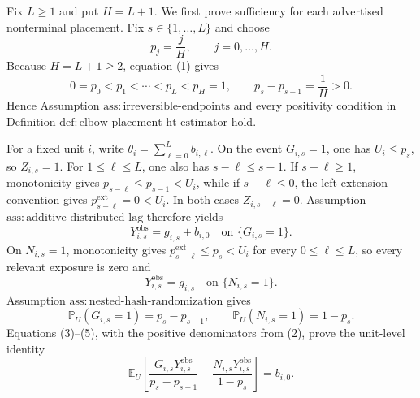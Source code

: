 Fix \(L\geq1\) and put \(H=L+1\).  We first prove sufficiency for each advertised nonterminal placement.  Fix \(s\in\{1,\ldots,L\}\) and choose
\[
 p_j=\frac{j}{H},\qquad j=0,\ldots,H.
\tag{1}
\]
Because \(H=L+1\geq2\), equation (1) gives
\[
 0=p_0<p_1<\cdots<p_L<p_H=1,
 \qquad
 p_s-p_{s-1}=\frac1H>0.
\tag{2}
\]
Hence Assumption \(\mathrm{ass:irreversible\text{-}endpoints}\) and every positivity condition in Definition \(\mathrm{def:elbow\text{-}placement\text{-}ht\text{-}estimator}\) hold.

For a fixed unit \(i\), write \(\theta_i=\sum_{\ell=0}^{L}b_{i,\ell}\).  On the event \(G_{i,s}=1\), one has \(U_i\leq p_s\), so \(Z_{i,s}=1\).  For \(1\leq\ell\leq L\), one also has \(s-\ell\leq s-1\).  If \(s-\ell\geq1\), monotonicity gives \(p_{s-\ell}\leq p_{s-1}<U_i\), while if \(s-\ell\leq0\), the left-extension convention gives \(p^{\mathrm{ext}}_{s-\ell}=0<U_i\).  In both cases \(Z_{i,s-\ell}=0\).  Assumption \(\mathrm{ass:additive\text{-}distributed\text{-}lag}\) therefore yields
\[
 Y^{\mathrm{obs}}_{i,s}=g_{i,s}+b_{i,0}
 \quad\text{on }\{G_{i,s}=1\}.
\tag{3}
\]
On \(N_{i,s}=1\), monotonicity gives \(p^{\mathrm{ext}}_{s-\ell}\leq p_s<U_i\) for every \(0\leq\ell\leq L\), so every relevant exposure is zero and
\[
 Y^{\mathrm{obs}}_{i,s}=g_{i,s}
 \quad\text{on }\{N_{i,s}=1\}.
\tag{4}
\]
Assumption \(\mathrm{ass:nested\text{-}hash\text{-}randomization}\) gives
\[
 \mathbb P_U(G_{i,s}=1)=p_s-p_{s-1},
 \qquad
 \mathbb P_U(N_{i,s}=1)=1-p_s.
\tag{5}
\]
Equations (3)--(5), with the positive denominators from (2), prove the unit-level identity
\[
 \mathbb E_U\!\left[
 \frac{G_{i,s}Y^{\mathrm{obs}}_{i,s}}{p_s-p_{s-1}}
 -\frac{N_{i,s}Y^{\mathrm{obs}}_{i,s}}{1-p_s}
 \right]
 =b_{i,0}.
\tag{6}
\]

